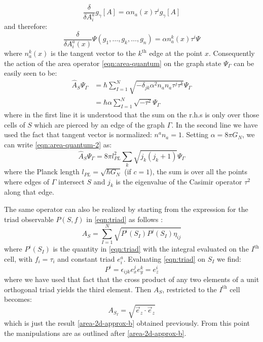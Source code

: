 \documentclass[11pt,a4paper,nofootinbib]{revtex4-1}
\begin{document}
\begin{equation}\label{eqn:edge-momentum}
	\frac{\delta}{\delta A^a_i} g_\gamma[A] = \alpha n_a (x) \tau^i g_\gamma[A]
\end{equation}
and therefore:
\begin{equation}\label{eqn:graph-momentum}
	\frac{\delta}{\delta A^a_i(x)} \Psi(g_1,\ldots,g_k,\ldots,g_n) = \alpha n_a^k(x) \tau^i \Psi
\end{equation}
where $ n_a^k(x) $ is the tangent vector to the $ k^\text{th} $ edge at the point $ x $. Consequently the action of the area operator \eqref{eqn:area-quantum} on the graph state $ \Psi_\Gamma $ can be easily seen to be:
\begin{align}\label{eqn:area-quantum-2}
	\hat A_S \Psi_\Gamma & = \hbar \sum_{I=1}^N \sqrt{-\delta_{jk} \alpha^2 n_a n_a \tau^j \tau^k } \Psi_\Gamma \nonumber \\
	& = \hbar \alpha \sum_{I=1}^N \sqrt{- \tau^2} \Psi_\Gamma
\end{align}
where in the first line it is understood that the sum on the r.h.s is only over those cells of $ S $ which are pierced by an edge of the graph $ \Gamma $. In the second line we have used the fact that tangent vector is normalized: $ n^a n_a = 1 $. Setting $ \alpha = 8 \pi G_N $, we can write \eqref{eqn:area-quantum-2} as:
\begin{equation}\label{eqn:area-quantum-3}
	\hat A_S \Psi_\Gamma = 8 \pi l_{PL}^2 \sum_k \sqrt{ j_k (j_k + 1)} \Psi_\Gamma
\end{equation}
where the Planck length $ l_{PL} = \sqrt{\hbar G_N} $ (if $ c = 1 $), the sum is over all the points where edges of $ \Gamma $ intersect $ S $ and $ j_k $ is the eigenvalue of the Casimir operator $ \tau^2 $ along that edge.

The same operator can also be realized by starting from the expression for the triad observable $ P(S,f) $ in \eqref{eqn:triad} as follows \cite[Sec 5.1.1]{Ashtekar2004Background}:
\begin{equation}\label{eqn:area-observable}
	A_S = \sum_{I=1}^{N}\sqrt{P^i(S_I) P^j(S_I) \eta_{ij}}
\end{equation}
where $ P^i(S_I) $ is the quantity in \eqref{eqn:triad} with the integral evaluated on the $ I^\text{th} $ cell, with $ f_i = \tau_i $ and constant triad $ e^a_i $. Evaluating \eqref{eqn:triad} on $ S_I $ we find:
\begin{equation}\label{eqn:triad-2}
	P^i = \epsilon_{ijk} e_x^j e_y^k = e_z^i
\end{equation}
where we have used that fact that the cross product of any two elements of a unit orthogonal triad yields the third element. Then $ A_S $, restricted to the $ I^\text{th} $ cell becomes:
\begin{equation}\label{eqn:area-2}
	A_{S_I} = \sqrt{ \vec{e}_z \cdot \vec{e}_z }
\end{equation}
which is just the result \eqref{area-2d-approx-b} obtained previously. From this point the manipulations are as outlined after \eqref{area-2d-approx-b}.
\end{document}
